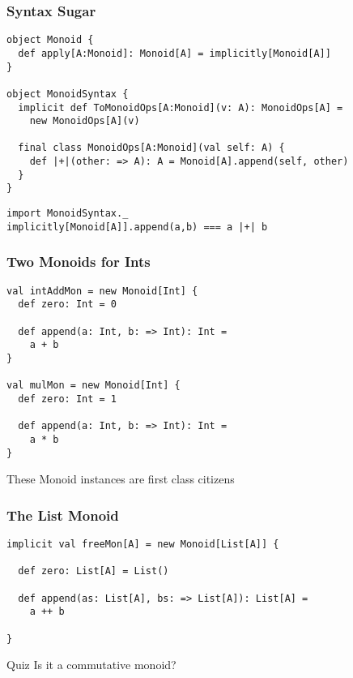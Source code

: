 \documentclass{beamer}
\begin{document}
\begin{frame}[fragile]\frametitle{Syntax Sugar}
  \begin{block}{}
  \begin{lstlisting}
object Monoid {
  def apply[A:Monoid]: Monoid[A] = implicitly[Monoid[A]]
}

object MonoidSyntax {
  implicit def ToMonoidOps[A:Monoid](v: A): MonoidOps[A] =
    new MonoidOps[A](v)

  final class MonoidOps[A:Monoid](val self: A) {
    def |+|(other: => A): A = Monoid[A].append(self, other)
  }
}
  \end{lstlisting}
  \end{block}
  \begin{block}{}
  \begin{lstlisting}
import MonoidSyntax._
implicitly[Monoid[A]].append(a,b) === a |+| b
  \end{lstlisting}
  \end{block}
\end{frame}

\begin{frame}[fragile]\frametitle{Two Monoids for Ints}
  \begin{block}{}
  \begin{lstlisting}
val intAddMon = new Monoid[Int] {
  def zero: Int = 0

  def append(a: Int, b: => Int): Int =
    a + b
}

val mulMon = new Monoid[Int] {
  def zero: Int = 1

  def append(a: Int, b: => Int): Int =
    a * b
}
  \end{lstlisting}
  \end{block}
  These Monoid \alert{instances} are first class citizens
\end{frame}

\begin{frame}[fragile]\frametitle{The List Monoid}
  \begin{block}{}

  \begin{lstlisting}
implicit val freeMon[A] = new Monoid[List[A]] {

  def zero: List[A] = List()

  def append(as: List[A], bs: => List[A]): List[A] =
    a ++ b

}
  \end{lstlisting}
  \end{block}

  \begin{block}{Quiz}
Is it a commutative monoid?
  \end{block}
\end{frame}
\end{document}
